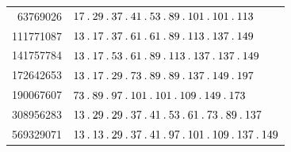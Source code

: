 %
\begingroup\small\setlength{\tabcolsep}{5pt}
\begin{longtable}{@{}r|l@{}}
63769026 & $17\mathbin{.} 29\mathbin{.} 37\mathbin{.} 41\mathbin{.} 53\mathbin{.} 89\mathbin{.} 101\mathbin{.} 101\mathbin{.} 113$\\
111771087 & $13\mathbin{.} 17\mathbin{.} 37\mathbin{.} 61\mathbin{.} 61\mathbin{.} 89\mathbin{.} 113\mathbin{.} 137\mathbin{.} 149$\\
141757784 & $13\mathbin{.} 17\mathbin{.} 53\mathbin{.} 61\mathbin{.} 89\mathbin{.} 113\mathbin{.} 137\mathbin{.} 137\mathbin{.} 149$\\
172642653 & $13\mathbin{.} 17\mathbin{.} 29\mathbin{.} 73\mathbin{.} 89\mathbin{.} 89\mathbin{.} 137\mathbin{.} 149\mathbin{.} 197$\\
190067607 & $73\mathbin{.} 89\mathbin{.} 97\mathbin{.} 101\mathbin{.} 101\mathbin{.} 109\mathbin{.} 149\mathbin{.} 173$\\
308956283 & $13\mathbin{.} 29\mathbin{.} 29\mathbin{.} 37\mathbin{.} 41\mathbin{.} 53\mathbin{.} 61\mathbin{.} 73\mathbin{.} 89\mathbin{.} 137$\\
569329071 & $13\mathbin{.} 13\mathbin{.} 29\mathbin{.} 37\mathbin{.} 41\mathbin{.} 97\mathbin{.} 101\mathbin{.} 109\mathbin{.} 137\mathbin{.} 149$\\
\end{longtable}\endgroup
\par\medskip\begingroup\small\setlength{\tabcolsep}{5pt}
